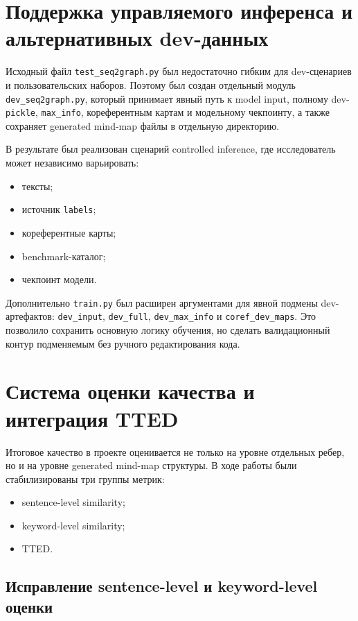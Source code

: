 \documentclass[12pt,a4paper]{article}
\begin{document}
\section{Поддержка управляемого инференса и альтернативных dev-данных}

Исходный файл \texttt{test\_seq2graph.py} был недостаточно гибким для dev-сценариев и пользовательских наборов. Поэтому был создан отдельный модуль \texttt{dev\_seq2graph.py}, который принимает явный путь к model input, полному dev-\texttt{pickle}, \texttt{max\_info}, кореферентным картам и модельному чекпоинту, а также сохраняет generated mind-map файлы в отдельную директорию.

В результате был реализован сценарий controlled inference, где исследователь может независимо варьировать:

\begin{itemize}
    \item тексты;
    \item источник \texttt{labels};
    \item кореферентные карты;
    \item benchmark-каталог;
    \item чекпоинт модели.
\end{itemize}

Дополнительно \texttt{train.py} был расширен аргументами для явной подмены dev-артефактов: \texttt{dev\_input}, \texttt{dev\_full}, \texttt{dev\_max\_info} и \texttt{coref\_dev\_maps}. Это позволило сохранить основную логику обучения, но сделать валидационный контур подменяемым без ручного редактирования кода.

\section{Система оценки качества и интеграция TTED}

Итоговое качество в проекте оценивается не только на уровне отдельных ребер, но и на уровне generated mind-map структуры. В ходе работы были стабилизированы три группы метрик:

\begin{itemize}
    \item sentence-level similarity;
    \item keyword-level similarity;
    \item TTED.
\end{itemize}

\subsection{Исправление sentence-level и keyword-level оценки}
\end{document}

